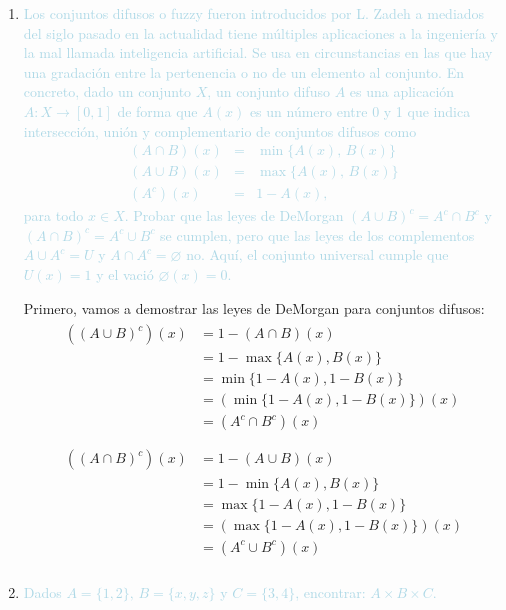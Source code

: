 \documentclass[12pt]{article}
\newcommand{\lb}[1]{\textcolor{lightblue}{#1}}
\begin{document}
\begin{enumerate}[label=\color{red}\textbf{\arabic*)},leftmargin=*]
\begin{enumerate}[label=\color{red}\alph*)]
      \end{enumerate}
      \item \lb{Los conjuntos difusos o fuzzy fueron introducidos por L. Zadeh a mediados del siglo pasado en la actualidad tiene múltiples aplicaciones a la ingeniería y la mal llamada inteligencia artificial. Se usa en circunstancias en las que hay una gradación entre la pertenencia o no de un elemento al conjunto. En concreto, dado un conjunto $X$, un conjunto difuso $A$ es una aplicación $A:X\longrightarrow [0,1]$ de forma que $A(x)$ es un número entre 0 y 1 que indica intersección, unión y complementario de conjuntos difusos como \[ \begin{array}{rcl}
      		(A\cap B)(x) & = & \min\{A(x),\,B(x)\}\\
      		(A\cup B)(x) & = & \max\{A(x),\,B(x)\}\\
      		(A^c)(x) & = & 1-A(x),
      	\end{array} \]para todo $x\in X$. Probar que las leyes de DeMorgan $(A\cup B)^c=A^c\cap B^c$ y $(A\cap B)^c=A^c\cup B^c$ se cumplen, pero que las leyes de los complementos $A\cup A^c=U$ y $A\cap A^c=\varnothing$ no. Aquí, el conjunto universal cumple que $U(x)=1$ y el vació $\varnothing(x)=0$.}
      
      Primero, vamos a demostrar las leyes de DeMorgan para conjuntos difusos:
      \[ \begin{array}{l}
      	\begin{aligned}
      		\left((A\cup B)^c\right)(x)&=1-\left(A\cap B\right)(x)\\
      		&=1-\max\{A(x),B(x)\}\\
      		&=\min\{1-A(x),1-B(x)\}\\
      		&=\left(\min\{1-A(x),1-B(x)\}\right)(x)\\
      		&=(A^c\cap B^c)(x)
      	\end{aligned}\\
      	\\
      	\begin{aligned}
      		\left((A\cap B)^c\right)(x)&=1-\left(A\cup B\right)(x)\\
      		&=1-\min\{A(x),B(x)\}\\
      		&=\max\{1-A(x),1-B(x)\}\\
      		&=\left(\max\{1-A(x),1-B(x)\}\right)(x)\\
      		&=(A^c\cup B^c)(x)
      	\end{aligned}\\
      \end{array} \]
      \item \lb{Dados $A=\{1,2\},\,B=\{x,y,z\}$ y $C=\{3,4\}$, encontrar: $A\times B\times C$.}
      

\end{enumerate}
\end{document}
